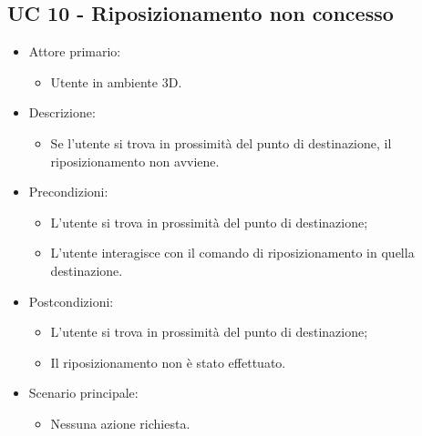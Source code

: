 \subsection{UC 10 - Riposizionamento non concesso}
\begin{itemize}

	\item Attore primario: 
	\begin{itemize}
		\item Utente in ambiente 3D.
	\end{itemize}
	\item Descrizione:
	\begin{itemize}
		\item Se l'utente si trova in prossimità del punto di destinazione, il riposizionamento non avviene.
	\end{itemize}
	
	\item Precondizioni:
	\begin{itemize}
		\item L'utente si trova in prossimità del punto di destinazione;
		\item L'utente interagisce con il comando di riposizionamento in quella destinazione.
	\end{itemize}
	
	\item Postcondizioni:
	\begin{itemize}
		\item L'utente si trova in prossimità del punto di destinazione;
		\item Il riposizionamento non è stato effettuato.
	\end{itemize}
	
	\item Scenario principale:
	\begin{itemize}
		\item Nessuna azione richiesta.
	\end{itemize}
	
\end{itemize}

\pagebreak

